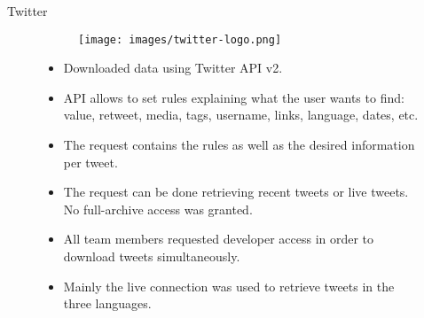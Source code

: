 \documentclass[aspectratio=169]{beamer}
\begin{document}
\begin{frame}{Twitter}
    
    \begin{figure}[H]
    
    \begin{figure}
    \centering
    \texttt{[image: images/twitter-logo.png]}
\end{figure}

\begin{itemize}
    \item Downloaded data using Twitter API v2.

    \item API allows to set rules explaining what the user wants to find: value, retweet, media, tags, username, links, language, dates, etc.
    
    \item The request contains the rules as well as the desired information per tweet.
\end{itemize}

    
\endminipage\hfill
{}
\begin{itemize}
    \item The request can be done retrieving recent tweets or live tweets. No full-archive access was granted.
    \item All team members requested developer access in order to download tweets simultaneously.
    \item Mainly the live connection was used to retrieve tweets in the three languages.
    \end{itemize}
\endminipage\hfill
\end{figure}


\end{frame}
\end{document}
